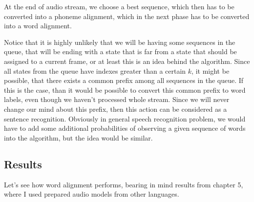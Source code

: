 \documentclass[12pt,a4paper,english]{article}
\begin{document}
At the end of audio stream, we choose a best sequence, which then has to be converted into a phoneme alignment, which in the next phase has to be converted into a word alignment. \newline

Notice that it is highly unlikely that we will be having some sequences in the queue, that will be ending with a state that is far from a state that should be assigned to a current frame, or at least this is an idea behind the algorithm. Since all states from the queue have indexes greater than a certain $k$, it might be possible, that there exists a common prefix among all sequences in the queue. If this is the case, than it would be possible to convert this common prefix to word labels, even though we haven't processed whole stream. Since we will never change our mind about this prefix, then this action can be considered as a sentence recognition. \newline
Obviously in general speech recognition problem, we would have to add some additional probabilities of observing a given sequence of words into the algorithm, but the idea would be similar.

\newpage

\subsection{Results}
Let's see how word alignment performs, bearing in mind results from chapter 5, where I used prepared audio models from other languages. \newline
\end{document}
